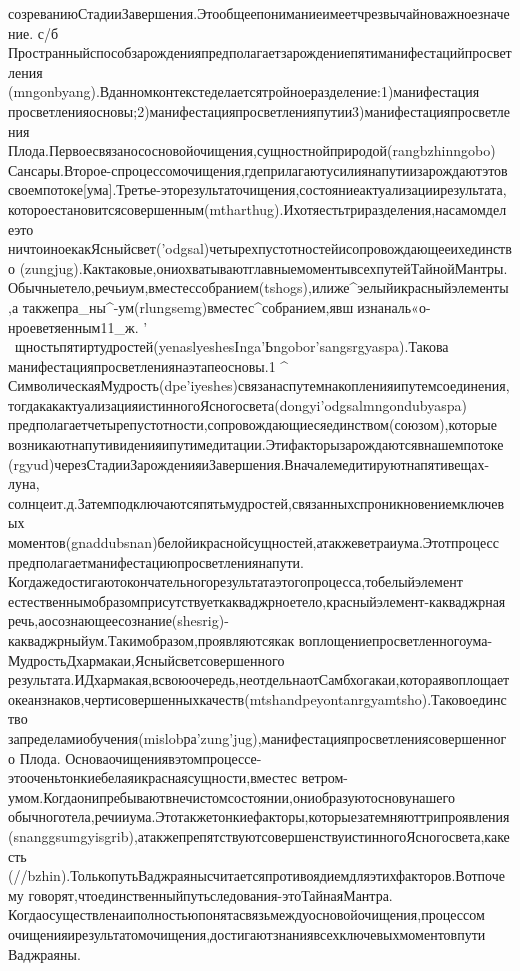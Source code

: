 созреваниюСтадииЗавершения.Этообщеепониманиеимеетчрезвычайноважноезначение.
с/б
Пространныйспособзарожденияпредполагаетзарождениепятиманифестацийпросветления
(mngonbyang).Вданномконтекстеделаетсятройноеразделение:1)манифестация
просветленияосновы;2)манифестацияпросветленияпутии3)манифестацияпросветления
Плода.Первоесвязанососновойочищения,сущностнойприродой(rangbzhinngobo)
Сансары.Второе-спроцессомочищения,гдеприлагаютусилиянапутиизарождаютэтов
своемпотоке[ума].Третье-эторезультаточищения,состояниеактуализациирезультата,
котороестановитсясовершенным(mtharthug).Ихотяестьтриразделения,насамомделеэто
ничтоиноекакЯсныйсвет('odgsal)четырехпустотностейисопровождающееихединство
(zungjug).Кактаковые,ониохватываютглавныемоментывсехпутейТайнойМантры.
Обычныетело,речьиум,вместессобранием(tshogs),илиже^эелыйикрасныйэлементы,а
такжепра_ны^-ум(rlungsemg)вместес^собранием,явш^^^изнаналь«о-нроеветяенным11_ж.
'   ~щностьпятиртудростей(yenaslyeshesInga'Ьngobor'sangsrgyaspa).Такова
манифестацияпросветлениянаэтапеосновы.1 ^\с
СимволическаяМудрость(dpe'iyeshes)связанаспутемнакопленияипутемсоединения,
тогдакакактуализацияистинногоЯсногосвета(dongyi'odgsalmngondubyaspa)
предполагаетчетырепустотности,сопровождающиесяединством(союзом),которые
возникаютнапутивиденияипутимедитации.Этифакторызарождаютсявнашемпотоке
(rgyud)черезСтадииЗарожденияиЗавершения.Вначалемедитируютнапятивещах-луна,
солнцеит.д.Затемподключаютсяпятьмудростей,связанныхспроникновениемключевых
моментов(gnaddubsnan)белойикраснойсущностей,атакжеветраиума.Этотпроцесс
предполагаетманифестациюпросветлениянапути.
Когдажедостигаютокончательногорезультатаэтогопроцесса,тобелыйэлемент
естественнымобразомприсутствуеткакваджрноетело,красныйэлемент-какваджрная
речь,аосознающеесознание(shesrig)-какваджрныйум.Такимобразом,проявляютсякак
воплощениепросветленногоума-МудростьДхармакаи,Ясныйсветсовершенного
результата.ИДхармакая,всвоюочередь,неотдельнаотСамбхогакаи,котораявоплощает
океанзнаков,чертисовершенныхкачеств(mtshandpeyontanrgyamtsho).Таковоединство
запределамиобучения(mislobра'zung'jug),манифестацияпросветлениясовершенного
Плода.
Основаочищениявэтомпроцессе-этооченьтонкиебелаяикраснаясущности,вместес
ветром-умом.Когдаонипребываютвнечистомсостоянии,ониобразуютосновунашего
обычноготела,речииума.Этотакжетонкиефакторы,которыезатемняюттрипроявления
(snanggsumgyisgrib),атакжепрепятствуютсовершенствуистинногоЯсногосвета,какесть
(//bzhin).ТолькопутьВаджраянысчитаетсяпротивоядиемдляэтихфакторов.Вотпочему
говорят,чтоединственныйпутьследования-этоТайнаяМантра.
Когдаосуществленаиполностьюпонятасвязьмеждуосновойочищения,процессом
очищенияирезультатомочищения,достигаютзнаниявсехключевыхмоментовпути
Ваджраяны.

